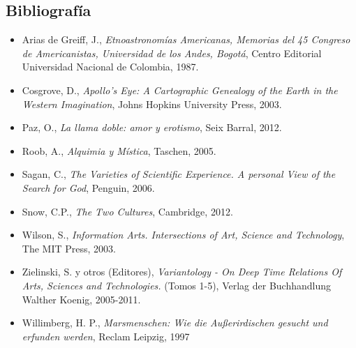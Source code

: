 \documentclass{report}
\begin{document}
\subsection*{Bibliograf\'ia}

\begin{itemize}

\item Arias de Greiff, J., \emph{Etnoastronom\'ias Americanas, Memorias
del 45 Congreso de Americanistas, Universidad de los Andes, Bogot\'a},
  Centro Editorial Universidad Nacional de Colombia, 1987.

\item Cosgrove, D., \emph{Apollo's Eye: A Cartographic Genealogy of
  the Earth in the Western Imagination}, Johns Hopkins University
  Press, 2003.
\item Paz, O., \emph{La llama doble: amor y erotismo}, Seix Barral, 2012.
\item Roob, A., \emph{Alquimia y M\'istica}, Taschen, 2005.
\item Sagan, C., \emph{The Varieties of Scientific Experience. A personal View of the Search for God}, Penguin, 2006.
\item Snow, C.P., \emph{The Two Cultures}, Cambridge, 2012.
\item Wilson, S., \emph{Information Arts. Intersections of Art, Science
and Technology}, The MIT Press, 2003.
\item Zielinski, S. y otros (Editores), \emph{Variantology - On Deep Time
  Relations Of Arts, Sciences and Technologies.} (Tomos 1-5), Verlag
der Buchhandlung Walther Koenig, 2005-2011.

\item Willimberg, H. P., \emph{Marsmenschen:  Wie die Au\ss erirdischen
  gesucht und erfunden werden}, Reclam Leipzig, 1997

\end{itemize}
\end{document}
